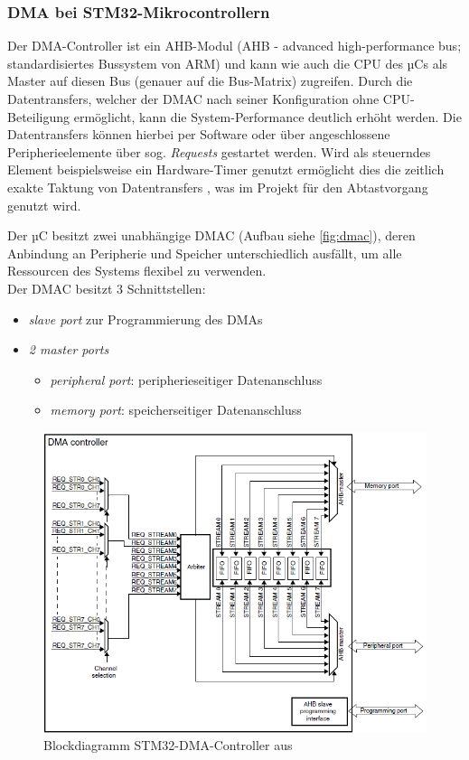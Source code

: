 \documentclass[a4paper, portrait, 12pt]{scrartcl} %
\begin{document}
\subsubsection{DMA bei STM32-Mikrocontrollern}
Der DMA-Controller ist ein AHB-Modul (AHB - advanced high-performance bus; standardisiertes Bussystem von ARM) und kann wie auch die CPU des µCs als Master auf diesen Bus (genauer auf die Bus-Matrix) zugreifen. Durch die Datentransfers, welcher der DMAC nach seiner Konfiguration ohne CPU-Beteiligung ermöglicht, kann die System-Performance deutlich erhöht werden. Die Datentransfers können hierbei per Software oder über angeschlossene Peripherieelemente über sog. \emph{Requests} gestartet werden. Wird als steuerndes Element beispielsweise ein Hardware-Timer genutzt ermöglicht dies die zeitlich exakte Taktung von Datentransfers \cite[S. 6]{STmicroelectronics2016}, was im Projekt für den Abtastvorgang genutzt wird.

Der µC besitzt zwei unabhängige DMAC (Aufbau siehe \autoref{fig:dmac}), deren Anbindung an Peripherie und Speicher unterschiedlich ausfällt, um alle Ressourcen des Systems flexibel zu verwenden.\\

Der DMAC besitzt 3 Schnittstellen:
\begin{itemize}
	\item \emph{slave port} zur Programmierung des DMAs
	\item \emph{2 master ports} \begin{itemize}
		\item \emph{peripheral port}: peripherieseitiger Datenanschluss
		\item \emph{memory port}: speicherseitiger Datenanschluss
	\end{itemize}
\end{itemize}

\begin{figure}[H]
	\centering
    \includegraphics[scale=0.8]{STM32_DMAC.png} 
	\caption{Blockdiagramm STM32-DMA-Controller aus \cite[S. 7]{STmicroelectronics2016}}
	\label{fig:dmac}
\end{figure}
\end{document}

